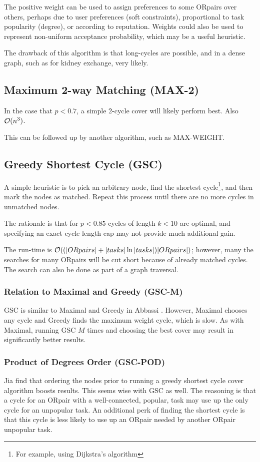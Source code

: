 \documentclass[main.tex]{subfiles}
\begin{document}
The positive weight can be used to assign preferences to some ORpairs over others, perhaps due to user preferences (soft constraints), proportional to task popularity (degree), or according to reputation. Weights could also be used to represent non-uniform acceptance probability, which may be a useful heuristic.

The drawback of this algorithm is that long-cycles are possible, and in a dense graph, such as for kidney exchange, very likely.

\subsection{Maximum 2-way Matching (MAX-2)}
In the case that $p < 0.7$, a simple 2-cycle cover will likely perform best. Also $\mathcal{O}(n^3)$.

This can be followed up by another algorithm, such as MAX-WEIGHT.

\subsection{Greedy Shortest Cycle (GSC)}\label{sec:gsc}
A simple heuristic is to pick an arbitrary node, find the shortest cycle\footnote{For example, using Dijkstra's algorithm}, and then mark the nodes as matched. Repeat this process until there are no more cycles in unmatched nodes.

The rationale is that for $p < 0.85$ cycles of length $k < 10$ are optimal, and specifying an exact cycle length cap may not provide much additional gain.

The run-time is $\mathcal{O}((|ORpairs| + |tasks|\ln|tasks|)|ORpairs|)$; however, many the searches for many ORpairs will be cut short because of already matched cycles. The search can also be done as part of a graph traversal.

\subsubsection{Relation to Maximal and Greedy (GSC-M)}
GSC is similar to Maximal and Greedy in Abbassi \cite{Abb1}. However, Maximal chooses any cycle and Greedy finds the maximum weight cycle, which is slow. As with Maximal, running GSC $M$ times and choosing the best cover may result in significantly better results.

\subsubsection{Product of Degrees Order (GSC-POD)}
Jia \cite{Jia1} find that ordering the nodes prior to running a greedy shortest cycle cover algorithm boosts results. This seems wise with GSC as well. The reasoning is that a cycle for an ORpair with a well-connected, popular, task may use up the only cycle for an unpopular task. An additional perk of finding the shortest cycle is that this cycle is less likely to use up an ORpair needed by another ORpair unpopular task.
\end{document}
